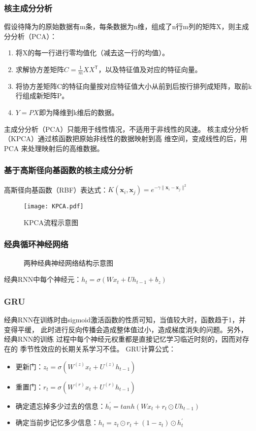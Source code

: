\documentclass[14pt, AutoFakeBold]{ppt}
\begin{document}
\begin{frame}
  \frametitle{核主成分分析}
  假设待降为的原始数据有m条，每条数据为n维，组成了n行m列的矩阵X，则主成分分析（PCA）：
  \begin{enumerate}
    \item 将X的每一行进行零均值化（减去这一行的均值）。
    \item 求解协方差矩阵$C=\frac{1}{m}XX^\mathsf{T}$，以及特征值及对应的特征向量。
    \item 将协方差矩阵C的特征向量按对应特征值大小从前到后按行排列成矩阵，取前k行组成新矩阵P。
    \item $Y=PX$即为降维到k维后的数据。
  \end{enumerate}

  主成分分析（PCA）只能用于线性情况，不适用于非线性的风速。
  \rightline{}
  核主成分分析（KPCA）通过核函数把原始非线性的数据映射到高
  维空间，变成线性的后，用 PCA 来处理映射后的高维数据。
\end{frame}

\begin{frame}
  \frametitle{基于高斯径向基函数的核主成分分析}
  高斯径向基函数（RBF）表达式：$K(\mathbf x_i,\mathbf x_j)=e^{-\gamma\|\mathbf x_i-\mathbf x_j\|^2}$
  \begin{figure}[H]
    \centering
    \texttt{[image: KPCA.pdf]}
    \caption{KPCA流程示意图}
    \label{fig_kpca}
  \end{figure}
\end{frame}

\begin{frame}
  \frametitle{经典循环神经网络}
  \begin{figure}[H]
    \centering
    \caption{两种经典神经网络结构示意图}
    \label{fig_nn}
  \end{figure}
  经典RNN中每个神经元：$h_t=\sigma(Wx_t+Uh_{t-1}+b_z)$
\end{frame}

\begin{frame}
  \frametitle{GRU}
  经典RNN在训练时由sigmoid激活函数的性质可知，当值较大时，函数趋于1，并变得平缓，
  此时进行反向传播会造成整体值过小，造成梯度消失的问题。另外，经典RNN的训练
  过程中每个神经元权重都是直接记忆学习临近时刻的，因而对存在的
  季节性效应的长期关系学习不佳。
  \rightline{}
  GRU计算公式：
  \begin{itemize}
    \item 更新门：$z_t=\sigma(W^{(z)}x_t+U^{(z)}h_{t-1})$
    \item 重置门：$r_t=\sigma(W^{(r)}x_t+U^{(r)}h_{t-1})$
    \item 确定遗忘掉多少过去的信息：$h^{\prime}_t=tanh(Wx_t+r_t\odot Uh_{t-1})$
    \item 确定当前步记忆多少信息：$h_t=z_t\odot r_t+(1-z_t)\odot h^{\prime}_t$
  \end{itemize}
\end{frame}
\end{document}
